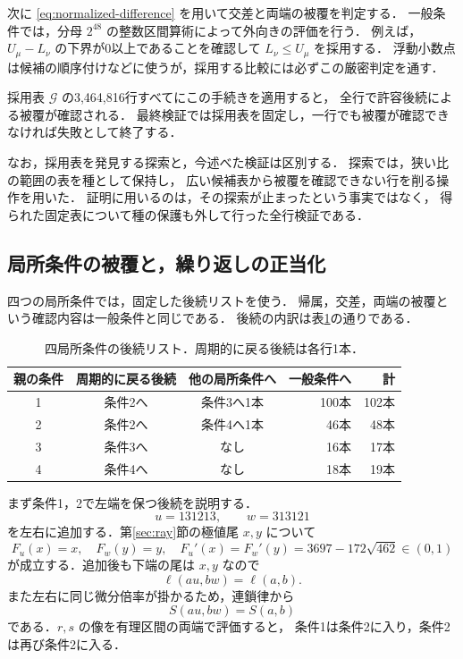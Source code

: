 \documentclass[11pt,a4paper]{article}
\theoremstyle{definition}
\newcommand{\G}{\mathcal G}
\begin{document}
次に \eqref{eq:normalized-difference} を用いて交差と両端の被覆を判定する．
一般条件では，分母 $2^{48}$ の整数区間算術によって外向きの評価を行う．
例えば，$U_\mu-L_\nu$ の下界が0以上であることを確認して
$L_\nu\le U_\mu$ を採用する．
浮動小数点は候補の順序付けなどに使うが，採用する比較には必ずこの厳密判定を通す．

採用表 $\G$ の3,464,816行すべてにこの手続きを適用すると，
全行で許容後続による被覆が確認される．
最終検証では採用表を固定し，一行でも被覆が確認できなければ失敗として終了する．

なお，採用表を発見する探索と，今述べた検証は区別する．
探索では，狭い比の範囲の表を種として保持し，
広い候補表から被覆を確認できない行を削る操作を用いた．
証明に用いるのは，その探索が止まったという事実ではなく，
得られた固定表について種の保護も外して行った全行検証である．

\subsection{局所条件の被覆と，繰り返しの正当化}
四つの局所条件では，固定した後続リストを使う．
帰属，交差，両端の被覆という確認内容は一般条件と同じである．
後続の内訳は表\ref{tab:local-menus}の通りである．

\begin{table}[htbp]
\centering\small
\begin{tabular}{cccrr}
\toprule
親の条件 & 周期的に戻る後続 & 他の局所条件へ & 一般条件へ & 計\\
\midrule
1 & 条件2へ & 条件3へ1本 & 100本 & 102本\\
2 & 条件2へ & 条件4へ1本 & 46本 & 48本\\
3 & 条件3へ & なし & 16本 & 17本\\
4 & 条件4へ & なし & 18本 & 19本\\
\bottomrule
\end{tabular}
\caption{四局所条件の後続リスト．周期的に戻る後続は各行1本．}
\label{tab:local-menus}
\end{table}

まず条件1，2で左端を保つ後続を説明する．
\[
 u=131213,\qquad w=313121
\]
を左右に追加する．第\ref{sec:ray}節の極値尾 $x,y$ について
\[
 F_u(x)=x,\quad F_w(y)=y,\quad
 F_u'(x)=F_w'(y)=3697-172\sqrt{462}\in(0,1)
\]
が成立する．追加後も下端の尾は $x,y$ なので
\[
 \ell(au,bw)=\ell(a,b).
\]
また左右に同じ微分倍率が掛かるため，連鎖律から
\[
 S(au,bw)=S(a,b)
\]
である．$r,s$ の像を有理区間の両端で評価すると，
条件1は条件2に入り，条件2は再び条件2に入る．
\end{document}
